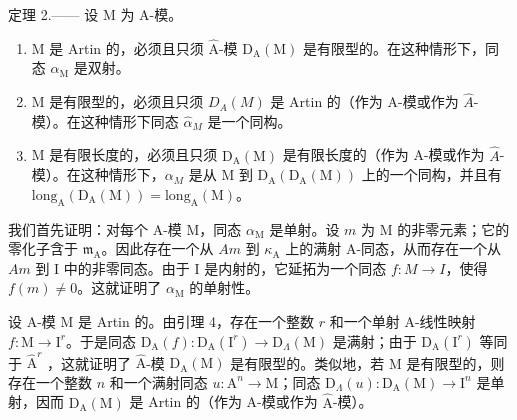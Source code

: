 定理 2.—— 设 M 为 A-模。

\begin{enumerate}
\def\labelenumi{\alph{enumi})}
\item
  M 是 Artin 的，必须且只须 \(\hat{\mathrm{A}}\)-模 \(\mathrm{D}_{\mathrm{A}}(\mathrm{M})\) 是有限型的。在这种情形下，同态 \(\alpha_{\mathrm{M}}\) 是双射。
\item
  M 是有限型的，必须且只须 \(D_{A}(M)\) 是 Artin 的（作为 A-模或作为 \(\hat{A}\)-模）。在这种情形下同态 \(\hat{\alpha}_{M}\) 是一个同构。
\item
  M 是有限长度的，必须且只须 \(\mathrm{D}_{\mathrm{A}}(\mathrm{M})\) 是有限长度的（作为 A-模或作为 \(\widehat{A}\)-模）。在这种情形下，\(\alpha_{M}\) 是从 M 到 \(\mathrm{D}_{\mathrm{A}}(\mathrm{D}_{\mathrm{A}}(\mathrm{M}))\) 上的一个同构，并且有 \(\mathrm{long}_{\mathrm{A}}(\mathrm{D}_{\mathrm{A}}(\mathrm{M})) = \mathrm{long}_{\mathrm{A}}(\mathrm{M})\)。
\end{enumerate}

我们首先证明：对每个 A-模 M，同态 \(\alpha_{\mathrm{M}}\) 是单射。设 \(m\) 为 M 的非零元素；它的零化子含于 \(\mathfrak{m}_{\mathrm{A}}\)。因此存在一个从 \(Am\) 到 \(\kappa_{\mathrm{A}}\) 上的满射 A-同态，从而存在一个从 \(Am\) 到 I 中的非零同态。由于 I 是内射的，它延拓为一个同态 \(f:M\to I\)，使得 \(f(m)\neq0\)。这就证明了 \(\alpha_{\mathrm{M}}\) 的单射性。

设 A-模 M 是 Artin 的。由引理 4，存在一个整数 \(r\) 和一个单射 A-线性映射 \(f: \mathrm{M} \to \mathrm{I}^r\)。于是同态 \(\mathrm{D}_{\mathrm{A}}(f): \mathrm{D}_{\mathrm{A}}(\mathrm{I}^r) \longrightarrow \mathrm{D}_{\Lambda}(\mathrm{M})\) 是满射；由于 \(\mathrm{D}_{\mathrm{A}}(\mathrm{I}^r)\) 等同于 \(\widehat{\mathrm{A}}^r\) ，这就证明了 \(\widehat{\mathrm{A}}\)-模 \(\mathrm{D}_{\mathrm{A}}(\mathrm{M})\) 是有限型的。类似地，若 M 是有限型的，则存在一个整数 \(n\) 和一个满射同态 \(u: \mathrm{A}^n \to \mathrm{M}\)；同态 \(\mathrm{D}_{\Lambda}(u): \mathrm{D}_{\mathrm{A}}(\mathrm{M}) \to \mathrm{I}^n\) 是单射，因而 \(\mathrm{D}_{\mathrm{A}}(\mathrm{M})\) 是 Artin 的（作为 A-模或作为 \(\widehat{\mathrm{A}}\)-模）。

